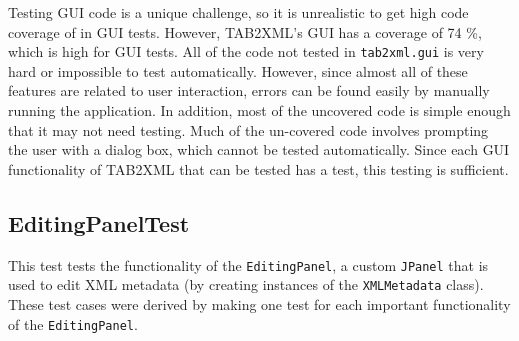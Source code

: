 \documentclass[11pt]{article}
\begin{document}
Testing GUI code is a unique challenge, so it is unrealistic to get high code coverage of in GUI tests.  However, TAB2XML's GUI has a coverage of 74 \%, which is high for GUI tests.  All of the code not tested in \texttt{tab2xml.gui} is very hard or impossible to test automatically.  However, since almost all of these features are related to user interaction, errors can be found easily by manually running the application.  In addition, most of the uncovered code is simple enough that it may not need testing.  Much of the un-covered code involves prompting the user with a dialog box, which cannot be tested automatically.  Since each GUI functionality of TAB2XML that can be tested has a test, this testing is sufficient.
\subsection{EditingPanelTest}
\label{sec:org791b593}
This test tests the functionality of the \texttt{EditingPanel}, a custom \texttt{JPanel} that is used to edit XML metadata (by creating instances of the \texttt{XMLMetadata} class).  These test cases were derived by making one test for each important functionality of the \texttt{EditingPanel}.
\end{document}
